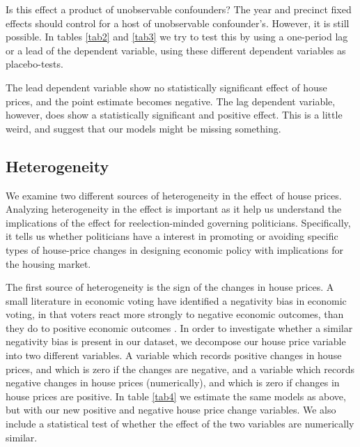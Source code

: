 \documentclass[12pt,a4paper]{article}
\begin{document}


Is this effect a product of unobservable confounders? The year and precinct fixed effects should control for a host of unobservable confounder's. However, it is still possible. In tables \ref{tab2} and \ref{tab3} we try to test this by using a one-period lag or a lead of the dependent variable, using these different dependent variables as placebo-tests.






The lead dependent variable show no statistically significant effect of house prices, and the point estimate 
becomes negative. The lag dependent variable, however, does show a statistically significant and positive effect. This is a little weird, and suggest that our models might be missing something. 



\subsection{Heterogeneity}

We examine two different sources of heterogeneity in the effect of house prices. Analyzing heterogeneity in the effect is important as it help us understand the implications  of the effect for reelection-minded governing politicians. Specifically, it tells us whether politicians have a interest in promoting or avoiding  specific types of house-price changes in designing economic policy with implications for the housing market. %

The first source of heterogeneity is the sign of the changes in house prices. A small literature in economic voting have identified a negativity bias in economic voting, in that voters react more strongly to negative economic outcomes, than they do to positive economic outcomes \citep[e.g.][]{bloom1975voter}. In order to investigate whether a similar negativity bias is present in our dataset, we decompose our house price variable into two different variables. A variable which records positive changes in house prices, and which is zero if the changes are negative, and a variable which records negative changes in house prices (numerically), and which is zero if changes in house prices are positive. In table \ref{tab4} we estimate the same models as above, but with our new positive and negative house price change variables. We also include a statistical test of whether the effect of the two variables are numerically similar. 
\end{document}
